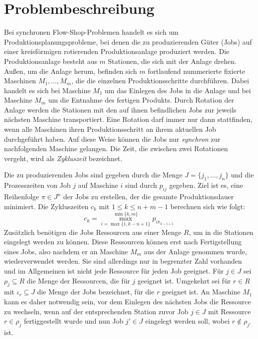 \documentclass{article}
\begin{document}
\section{Problembeschreibung}
Bei synchronen Flow-Shop-Problemen handelt es sich um Produktions\-planungs\-probleme,
bei denen die zu produzierenden Güter (Jobs) auf einer kreisförmigen rotierenden Produktionsanlage
produziert werden. Die Produktionsanlage be\-steht aus $m$ Stationen, die sich mit der Anlage drehen.
Außen, um die Anlage herum, befinden sich $m$ fortlaufend nummerierte fixierte Maschinen $M_1,\dots,M_m$, die die einzelnen Produktionsschritte durchführen.
Dabei handelt es sich bei Maschine $M_1$ um das Einlegen des Jobs in die Anlage und bei Maschine $M_m$ um die Entnahme des fertigen Produkts.
Durch Rotation der Anlage werden die Stationen mit den auf ihnen befindlichen Jobs zur jeweils nächsten Maschine transportiert.
Eine Rotation darf immer nur dann stattfinden, wenn alle Maschinen ihren Produktionsschritt an ihrem aktuellen Job
durchgeführt haben. Auf diese Weise können die Jobs nur \textit{synchron} zur nachfolgenden Maschine gelangen.
Die Zeit, die zwischen zwei Rotationen vergeht, wird als \textit{Zykluszeit} bezeichnet.

Die zu produzierenden Jobs sind gegeben durch die Menge $J=\{j_1,\dots,j_n\}$ 
und die Prozesszeiten von Job $j$ auf Maschine $i$ sind durch $p_{ij}$ gegeben.
Ziel ist es, eine Reihenfolge $\pi\in J^n$ der Jobs zu erstellen, der die gesamte Produktionsdauer minimiert.
Die Zykluszeiten $c_k$ mit $1\leq k\leq n+m-1$ berechnen sich wie folgt:
\[ c_k = \max_{i=\max\{1,k-n+1\}}^{\min\{k,m\}} p_{i\pi_{k-i+1}} \]
Zusätzlich benötigen die Jobs Ressourcen aus einer Menge $R$, um in die Stationen eingelegt werden zu können. Diese Ressourcen können erst nach
Fertigstellung eines Jobs, also nachdem er an Maschine $M_m$ aus der Anlage genommen wurde, wiederverwendet werden.
Sie sind allerdings nur in begrenzter Zahl vorhanden und im Allgemeinen ist nicht jede Ressource für jeden Job geeignet.
Für $j\in J$ sei $\rho_j\subseteq R$ die Menge der Ressourcen, die für $j$ geeignet ist.
Umgekehrt sei für $r\in R$ mit $\iota_r\subseteq J$ die Menge der Jobs bezeichnet, für die $r$ geeignet ist.
An Maschine $M_1$ kann es daher notwendig sein, vor dem Einlegen des nächsten Jobs die Ressource zu wechseln, 
wenn auf der entsprechenden Station zuvor Job $j\in J$ mit Ressource $r\in\rho_j$ fertiggestellt wurde 
und nun Job $j'\in J$ eingelegt werden soll, wobei $r\not\in\rho_{j'}$ ist.
\end{document}
